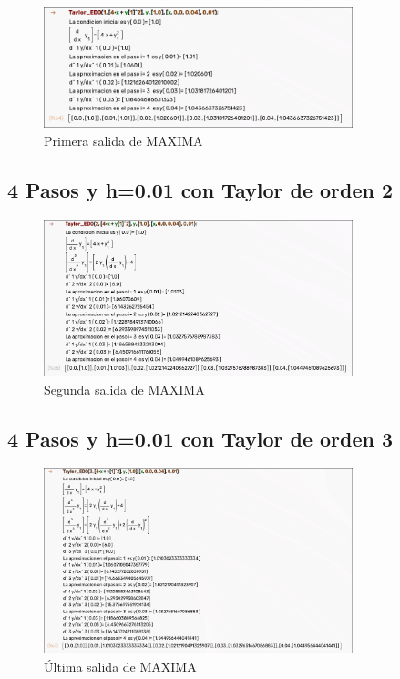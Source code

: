 \documentclass{article}
\begin{document}
\begin{figure}[h]
    \centering
    \includegraphics[width=0.8\textwidth]{src/taylor1.png}
    \caption{Primera salida de MAXIMA}
    \label{fig:maxima_output}
\end{figure}

\subsection{4 Pasos y h=0.01 con Taylor de orden 2}

\begin{figure}[h]
    \centering
    \includegraphics[width=0.8\textwidth]{src/taylor2.png}
    \caption{Segunda salida de MAXIMA}
    \label{fig:maxima_output2}
\end{figure}


\newpage


\subsection{4 Pasos y h=0.01 con Taylor de orden 3}

\begin{figure}[h]
    \centering
    \includegraphics[width=0.8\textwidth]{src/taylor3.png}
    \caption{Última salida de MAXIMA}
    \label{fig:maxima_output3}
\end{figure}
\end{document}
